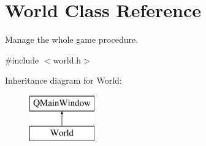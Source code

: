 \hypertarget{class_world}{}\section{World Class Reference}
\label{class_world}


Manage the whole game procedure.  




{\ttfamily \#include $<$world.\+h$>$}

Inheritance diagram for World\+:\begin{figure}[H]
\begin{center}
\leavevmode
\includegraphics[height=2.000000cm]{class_world}
\end{center}
\end{figure}

